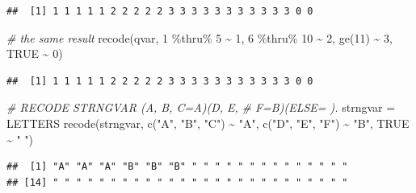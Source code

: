 \documentclass[
]{book}
\newenvironment{Shaded}{\begin{snugshade}}{\end{snugshade}}
\newcommand{\CommentTok}[1]{\textcolor[rgb]{0.56,0.35,0.01}{\textit{#1}}}
\newcommand{\ConstantTok}[1]{\textcolor[rgb]{0.00,0.00,0.00}{#1}}
\newcommand{\DecValTok}[1]{\textcolor[rgb]{0.00,0.00,0.81}{#1}}
\newcommand{\FunctionTok}[1]{\textcolor[rgb]{0.00,0.00,0.00}{#1}}
\newcommand{\NormalTok}[1]{#1}
\newcommand{\OtherTok}[1]{\textcolor[rgb]{0.56,0.35,0.01}{#1}}
\newcommand{\SpecialCharTok}[1]{\textcolor[rgb]{0.00,0.00,0.00}{#1}}
\newcommand{\StringTok}[1]{\textcolor[rgb]{0.31,0.60,0.02}{#1}}
\begin{document}
\begin{verbatim}
##  [1] 1 1 1 1 1 2 2 2 2 2 3 3 3 3 3 3 3 3 3 3 3 0 0
\end{verbatim}

\begin{Shaded}
\begin{Highlighting}[]
\CommentTok{\# the same result}
\FunctionTok{recode}\NormalTok{(qvar, }\DecValTok{1} \SpecialCharTok{\%thru\%} \DecValTok{5} \SpecialCharTok{\textasciitilde{}} \DecValTok{1}\NormalTok{, }\DecValTok{6} \SpecialCharTok{\%thru\%} \DecValTok{10} \SpecialCharTok{\textasciitilde{}} \DecValTok{2}\NormalTok{, }\FunctionTok{ge}\NormalTok{(}\DecValTok{11}\NormalTok{) }\SpecialCharTok{\textasciitilde{}} \DecValTok{3}\NormalTok{,}
  \ConstantTok{TRUE} \SpecialCharTok{\textasciitilde{}} \DecValTok{0}\NormalTok{)}
\end{Highlighting}
\end{Shaded}

\begin{verbatim}
##  [1] 1 1 1 1 1 2 2 2 2 2 3 3 3 3 3 3 3 3 3 3 3 0 0
\end{verbatim}

\begin{Shaded}
\begin{Highlighting}[]
\CommentTok{\# RECODE STRNGVAR (\textquotesingle{}A\textquotesingle{}, \textquotesingle{}B\textquotesingle{}, \textquotesingle{}C\textquotesingle{}=\textquotesingle{}A\textquotesingle{})(\textquotesingle{}D\textquotesingle{}, \textquotesingle{}E\textquotesingle{},}
\CommentTok{\# \textquotesingle{}F\textquotesingle{}=\textquotesingle{}B\textquotesingle{})(ELSE=\textquotesingle{} \textquotesingle{}).}
\NormalTok{strngvar }\OtherTok{=}\NormalTok{ LETTERS}
\FunctionTok{recode}\NormalTok{(strngvar, }\FunctionTok{c}\NormalTok{(}\StringTok{"A"}\NormalTok{, }\StringTok{"B"}\NormalTok{, }\StringTok{"C"}\NormalTok{) }\SpecialCharTok{\textasciitilde{}} \StringTok{"A"}\NormalTok{, }\FunctionTok{c}\NormalTok{(}\StringTok{"D"}\NormalTok{, }\StringTok{"E"}\NormalTok{, }\StringTok{"F"}\NormalTok{) }\SpecialCharTok{\textasciitilde{}}
  \StringTok{"B"}\NormalTok{, }\ConstantTok{TRUE} \SpecialCharTok{\textasciitilde{}} \StringTok{" "}\NormalTok{)}
\end{Highlighting}
\end{Shaded}

\begin{verbatim}
##  [1] "A" "A" "A" "B" "B" "B" " " " " " " " " " " " " " "
## [14] " " " " " " " " " " " " " " " " " " " " " " " " " "
\end{verbatim}
\end{document}
